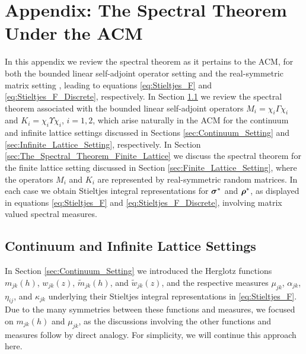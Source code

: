 \documentclass{cmslatex}
\newcommand\bsig{\mbox{\boldmath${\sigma}$}}
\newcommand\brho{\mbox{\boldmath${\rho}$}}
\begin{document}
\section{Appendix: The Spectral Theorem Under the ACM} 
\label{sec:The_Spectral_Theorem}
%
In this appendix we review the spectral theorem as it pertains to the
ACM, for both the bounded linear self-adjoint operator setting
\cite{Reed-1980,Stone:64} and the real-symmetric matrix setting
\cite{Halmos-1958,Horn_Johnson-1990}, leading to equations
\eqref{eq:Stieltjes_F} and \eqref{eq:Stieltjes_F_Discrete}, 
respectively. In Section \ref{sec:The_Spectral_Theorem_Continuum} we
review the spectral theorem associated with the bounded linear
self-adjoint operators $M_i=\chi_i\Gamma\chi_i$ and $K_i=\chi_i\Upsilon\chi_i$, $i=1,2$, which
arise naturally in the ACM for the continuum and infinite lattice
settings discussed in Sections \ref{sec:Continuum_Setting} and
\ref{sec:Infinite_Lattice_Setting}, respectively.  In Section 
\ref{sec:The_Spectral_Theorem_Finite_Lattice} we discuss the spectral 
theorem for the finite lattice setting discussed in Section
\ref{sec:Finite_Lattice_Setting}, where the operators $M_i$ and $K_i$
are represented by real-symmetric random matrices. In each case we
obtain Stieltjes integral representations for $\bsig^*$ and $\brho^*$,
as displayed in equations \eqref{eq:Stieltjes_F} and
\eqref{eq:Stieltjes_F_Discrete}, involving matrix valued spectral
measures. 
%
\subsection{Continuum  and Infinite Lattice Settings}
\label{sec:The_Spectral_Theorem_Continuum} 
%
In Section \ref{sec:Continuum_Setting} we introduced the Herglotz 
functions $m_{jk}(h)$, $w_{jk}(z)$, $\tilde{m}_{jk}(h)$, and
$\tilde{w}_{jk}(z)$, and the respective measures $\mu_{jk}$, $\alpha_{jk}$,
$\eta_{ij}$, and $\kappa_{jk}$ underlying their Stieltjes integral
representations in \eqref{eq:Stieltjes_F}. Due to the many symmetries
between these functions and measures, we focused on $m_{jk}(h)$ and
$\mu_{jk}$, as the discussions involving the other functions and
measures follow by direct analogy. For simplicity, we will continue
this approach here.  
\end{document}
